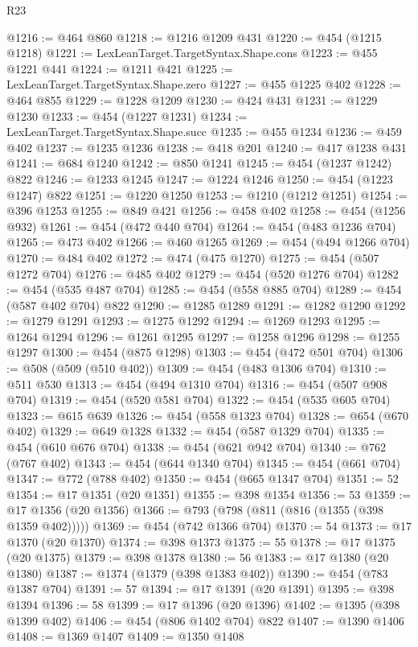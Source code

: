 \begin{lexlean}{R23}
\begin{coremodule}
{{{{{{{{{{{{{{{{{{{{{{{{{{{{{{{{{{{{{{{{{{{{{{{{{{{{{{{{{{{{{{{{{{{{{{{{{{{{{{{{{{{{{{{{{{{{{@1216 := @464 @860
@1218 := @1216 @1209 @431
@1220 := @454 (@1215 @1218)
@1221 := LexLeanTarget.TargetSyntax.Shape.cons
@1223 := @455 @1221 @441
@1224 := @1211 @421
@1225 := LexLeanTarget.TargetSyntax.Shape.zero
@1227 := @455 @1225 @402
@1228 := @464 @855
@1229 := @1228 @1209
@1230 := @424 @431
@1231 := @1229 @1230
@1233 := @454 (@1227 @1231)
@1234 := LexLeanTarget.TargetSyntax.Shape.succ
@1235 := @455 @1234
@1236 := @459 @402
@1237 := @1235 @1236
@1238 := @418 @201
@1240 := @417 @1238 @431
@1241 := @684 @1240
@1242 := @850 @1241
@1245 := @454 (@1237 @1242) @822
@1246 := @1233 @1245
@1247 := @1224 @1246
@1250 := @454 (@1223 @1247) @822
@1251 := @1220 @1250
@1253 := @1210 (@1212 @1251)
@1254 := @396 @1253
@1255 := @849 @421
@1256 := @458 @402
@1258 := @454 (@1256 @932)
@1261 := @454 (@472 @440 @704)
@1264 := @454 (@483 @1236 @704)
@1265 := @473 @402
@1266 := @460 @1265
@1269 := @454 (@494 @1266 @704)
@1270 := @484 @402
@1272 := @474 (@475 @1270)
@1275 := @454 (@507 @1272 @704)
@1276 := @485 @402
@1279 := @454 (@520 @1276 @704)
@1282 := @454 (@535 @487 @704)
@1285 := @454 (@558 @885 @704)
@1289 := @454 (@587 @402 @704) @822
@1290 := @1285 @1289
@1291 := @1282 @1290
@1292 := @1279 @1291
@1293 := @1275 @1292
@1294 := @1269 @1293
@1295 := @1264 @1294
@1296 := @1261 @1295
@1297 := @1258 @1296
@1298 := @1255 @1297
@1300 := @454 (@875 @1298)
@1303 := @454 (@472 @501 @704)
@1306 := @508 (@509 (@510 @402))
@1309 := @454 (@483 @1306 @704)
@1310 := @511 @530
@1313 := @454 (@494 @1310 @704)
@1316 := @454 (@507 @908 @704)
@1319 := @454 (@520 @581 @704)
@1322 := @454 (@535 @605 @704)
@1323 := @615 @639
@1326 := @454 (@558 @1323 @704)
@1328 := @654 (@670 @402)
@1329 := @649 @1328
@1332 := @454 (@587 @1329 @704)
@1335 := @454 (@610 @676 @704)
@1338 := @454 (@621 @942 @704)
@1340 := @762 (@767 @402)
@1343 := @454 (@644 @1340 @704)
@1345 := @454 (@661 @704)
@1347 := @772 (@788 @402)
@1350 := @454 (@665 @1347 @704)
@1351 := 52
@1354 := @17 @1351 (@20 @1351)
@1355 := @398 @1354
@1356 := 53
@1359 := @17 @1356 (@20 @1356)
@1366 := @793 (@798 (@811 (@816 (@1355 (@398 @1359 @402)))))
@1369 := @454 (@742 @1366 @704)
@1370 := 54
@1373 := @17 @1370 (@20 @1370)
@1374 := @398 @1373
@1375 := 55
@1378 := @17 @1375 (@20 @1375)
@1379 := @398 @1378
@1380 := 56
@1383 := @17 @1380 (@20 @1380)
@1387 := @1374 (@1379 (@398 @1383 @402))
@1390 := @454 (@783 @1387 @704)
@1391 := 57
@1394 := @17 @1391 (@20 @1391)
@1395 := @398 @1394
@1396 := 58
@1399 := @17 @1396 (@20 @1396)
@1402 := @1395 (@398 @1399 @402)
@1406 := @454 (@806 @1402 @704) @822
@1407 := @1390 @1406
@1408 := @1369 @1407
@1409 := @1350 @1408
}}}}}}}}}}}}}}}}}}}}}}}}}}}}}}}}}}}}}}}}}}}}}}}}}}}}}}}}}}}}}}}}}}}}}}}}}}}}}}}}}}}}}}}}}}}}}
\end{coremodule}
\end{lexlean}
